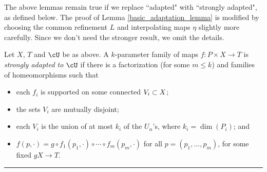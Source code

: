 \medskip


\medskip


The above lemmas remain true if we replace ``adapted" with ``strongly adapted", as defined below.
The proof of Lemma \ref{basic_adaptation_lemma} is modified by
choosing the common refinement $L$ and interpolating maps $\eta$
slightly more carefully.
Since we don't need the stronger result, we omit the details.

Let $X$, $T$ and $\cU$ be as above.
A $k$-parameter family of maps $f: P \times X \to T$ is
{\it strongly adapted to $\cU$} if there is a factorization
(for some $m \le k$)
and families of homeomorphisms
such that
\begin{itemize}
\item each $f_i$ is supported on some connected $V_i \subset X$;
\item the sets $V_i$ are mutually disjoint;
\item each $V_i$ is the union of at most $k_i$ of the $U_\alpha$'s,
where $k_i = \dim(P_i)$; and
\item $f(p, \cdot) = g \circ f_1(p_1, \cdot) \circ \cdots \circ f_m(p_m, \cdot)$
for all $p = (p_1, \ldots, p_m)$, for some fixed $gX\to T$.
\end{itemize}


\medskip
\hrule
\medskip




